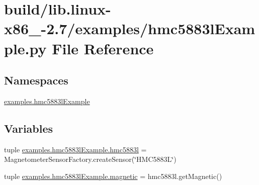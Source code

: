\hypertarget{build_2lib_8linux-x86__64-2_87_2examples_2hmc5883lExample_8py}{}\section{build/lib.linux-\/x86\+\_-\/2.7/examples/hmc5883l\+Example.py File Reference}
\label{build_2lib_8linux-x86__64-2_87_2examples_2hmc5883lExample_8py}
\subsection*{Namespaces}
\begin{DoxyCompactItemize}
\item 
 \hyperlink{namespaceexamples_1_1hmc5883lExample}{examples.\+hmc5883l\+Example}
\end{DoxyCompactItemize}
\subsection*{Variables}
\begin{DoxyCompactItemize}
\item 
tuple \hyperlink{namespaceexamples_1_1hmc5883lExample_a37e73faaa09cc453459295f1271f040d}{examples.\+hmc5883l\+Example.\+hmc5883l} = Magnetometer\+Sensor\+Factory.\+create\+Sensor(\char`\"{}H\+M\+C5883\+L\char`\"{})
\item 
tuple \hyperlink{namespaceexamples_1_1hmc5883lExample_aeb669a6b4c5f37c98cc14f4ef514c178}{examples.\+hmc5883l\+Example.\+magnetic} = hmc5883l.\+get\+Magnetic()
\end{DoxyCompactItemize}
